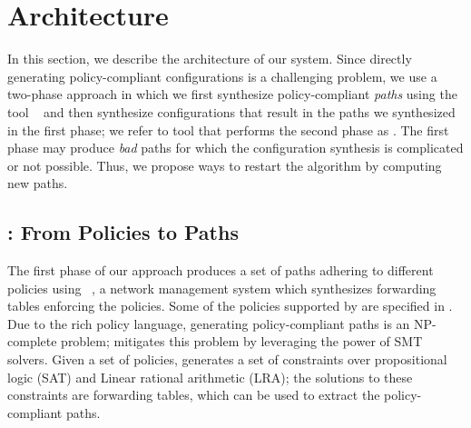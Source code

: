 \section{Architecture} \label{sec:architecture}
In this section, we describe the architecture of our system.  Since
directly generating policy-compliant configurations is a challenging
problem, we use a two-phase approach in which we first synthesize
policy-compliant \emph{paths} using the tool \genesis~\cite{genesis}
and then synthesize configurations that result in the paths we
synthesized in the first phase; we refer to tool that performs the second phase as \name.
The first phase may produce \emph{bad} paths for which the
configuration synthesis is complicated or not possible. Thus, we
propose ways to restart the algorithm by computing new paths.

\subsection{\genesis: From Policies to Paths} \label{sec:genesis}
The first phase of our approach produces a set of paths adhering to
different policies using \genesis~\cite{genesis}, a network management
system which synthesizes forwarding tables enforcing the policies. 
Some of the policies supported by \genesis are specified in 
. 
Due to the rich policy language, generating policy-compliant paths is an NP-complete problem;
\genesis mitigates this problem by leveraging the power of SMT solvers.
Given a set of policies, \genesis generates a set of constraints 
over propositional logic (SAT) and Linear rational arithmetic (LRA);
the solutions to these constraints are forwarding
tables, which can be used to extract the 
policy-compliant paths.

